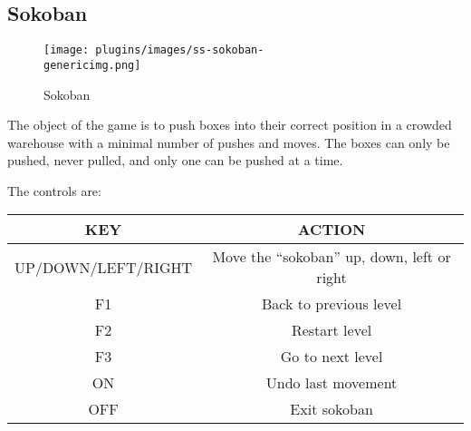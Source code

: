 \subsection{Sokoban}
\begin{figure}[h!]
\begin{center}
\texttt{[image: plugins/images/ss-sokoban-\\genericimg.png]}
\end{center}
\caption{Sokoban}
\end{figure}

The object of the game is to push boxes into their correct position in a
crowded warehouse with a minimal number of pushes and moves. The boxes
can only be pushed, never pulled, and only one can be pushed at a time.

The controls are:

\begin{table}[h!]
\begin{tabular}{|c|c|}
\hline
KEY & ACTION \\\hline
UP/DOWN/LEFT/RIGHT & Move the ``sokoban'' up, down, left or right \\\hline
F1 & Back to previous level \\\hline
F2 & Restart level \\\hline
F3 & Go to next level \\\hline
ON & Undo last movement \\\hline
OFF & Exit sokoban \\\hline
\end{tabular}
\end{table}


